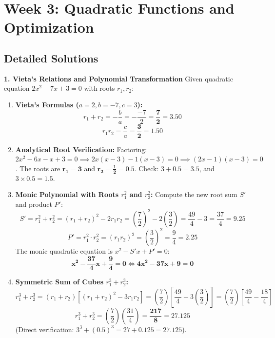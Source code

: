 \section*{Week 3: Quadratic Functions and Optimization}

\subsection*{Detailed Solutions}

\textbf{1. Vieta's Relations and Polynomial Transformation}
Given quadratic equation $2x^2 - 7x + 3 = 0$ with roots $r_1, r_2$:
\begin{enumerate}
    \item \textbf{Vieta's Formulas ($a = 2, b = -7, c = 3$):}
    $$r_1 + r_2 = -\frac{b}{a} = -\frac{-7}{2} = \mathbf{\frac{7}{2} = 3.50}$$
    $$r_1 r_2 = \frac{c}{a} = \mathbf{\frac{3}{2} = 1.50}$$
    \item \textbf{Analytical Root Verification:}
    Factoring: $2x^2 - 6x - x + 3 = 0 \implies 2x(x - 3) - 1(x - 3) = 0 \implies (2x - 1)(x - 3) = 0$.
    The roots are $\mathbf{r_1 = 3}$ and $\mathbf{r_2 = \frac{1}{2} = 0.5}$.
    Check: $3 + 0.5 = 3.5$, and $3 \times 0.5 = 1.5$.
    \item \textbf{Monic Polynomial with Roots $r_1^2$ and $r_2^2$:}
    Compute the new root sum $S'$ and product $P'$:
    $$S' = r_1^2 + r_2^2 = (r_1 + r_2)^2 - 2r_1 r_2 = \left( \frac{7}{2} \right)^2 - 2\left( \frac{3}{2} \right) = \frac{49}{4} - 3 = \frac{37}{4} = 9.25$$
    $$P' = r_1^2 \cdot r_2^2 = (r_1 r_2)^2 = \left( \frac{3}{2} \right)^2 = \frac{9}{4} = 2.25$$
    The monic quadratic equation is $x^2 - S'x + P' = 0$:
    $$\mathbf{x^2 - \frac{37}{4}x + \frac{9}{4} = 0 \iff 4x^2 - 37x + 9 = 0}$$
    \item \textbf{Symmetric Sum of Cubes $r_1^3 + r_2^3$:}
    $$r_1^3 + r_2^3 = (r_1 + r_2)\left[(r_1 + r_2)^2 - 3r_1 r_2\right] = \left(\frac{7}{2}\right)\left[\frac{49}{4} - 3\left(\frac{3}{2}\right)\right] = \left(\frac{7}{2}\right)\left[\frac{49}{4} - \frac{18}{4}\right]$$
    $$r_1^3 + r_2^3 = \left(\frac{7}{2}\right)\left(\frac{31}{4}\right) = \mathbf{\frac{217}{8} = 27.125}$$
    (Direct verification: $3^3 + (0.5)^3 = 27 + 0.125 = 27.125$).
\end{enumerate}

